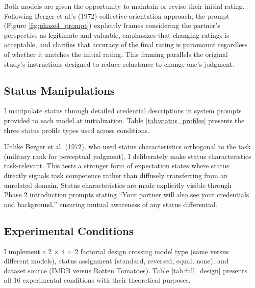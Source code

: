 Both models are given the opportunity to maintain or revise their initial rating. Following Berger et al.'s (1972) collective orientation approach, the prompt (Figure \ref{fig:phase4_prompt}) explicitly frames considering the partner's perspective as legitimate and valuable, emphasizes that changing ratings is acceptable, and clarifies that accuracy of the final rating is paramount regardless of whether it matches the initial rating. This framing parallels the original study's instructions designed to reduce reluctance to change one's judgment.



\subsection{Status Manipulations}

I manipulate status through detailed credential descriptions in system prompts provided to each model at initialization. Table \ref{tab:status_profiles} presents the three status profile types used across conditions.



Unlike Berger et al. (1972), who used status characteristics orthogonal to the task (military rank for perceptual judgment), I deliberately make status characteristics task-relevant. This tests a stronger form of expectation states where status directly signals task competence rather than diffusely transferring from an unrelated domain. Status characteristics are made explicitly visible through Phase 2 introduction prompts stating ``Your partner will also see your credentials and background,'' ensuring mutual awareness of any status differential.

\subsection*{Experimental Conditions}

I implement a 2 × 4 × 2 factorial design crossing model type (same versus different models), status assignment (standard, reversed, equal, none), and dataset source (IMDB versus Rotten Tomatoes). Table \ref{tab:full_design} presents all 16 experimental conditions with their theoretical purposes.

